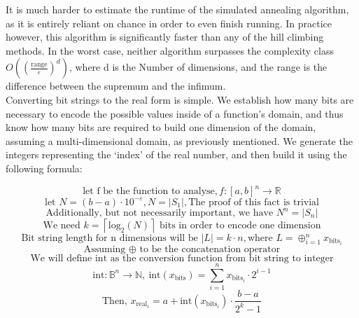 \documentclass{article}
\begin{document}
It is much harder to estimate the runtime of the simulated annealing algorithm, as it is entirely reliant on chance in order to even finish running. In practice however, this algorithm is significantly faster than any of the hill climbing methods.
In the worst case, neither algorithm surpasses the complexity class $O\left(\left(\frac{\text{range}}{\varepsilon}\right)^d\right)$, where d is the Number of dimensions, and the range is the difference between the supremum and the infimum. \\
Converting bit strings to the real form is simple. We establish how many bits are necessary to encode the possible values inside of a function's domain, and thus know how many bits are required to build one dimension of the domain, assuming a multi-dimensional domain, as previously mentioned. We generate the integers representing the `index' of the real number, and then build it using the following formula\cite{GA}:

$$ \text{let f be the function to analyse}, f \colon [a, b]^n \to \mathbb{R} $$
$$ \text{let } N = (b - a) \cdot 10^{-\varepsilon}, N = |S_1|, \text{The proof of this fact is trivial} $$
$$ \text{Additionally, but not necessarily important, we have } {N}^n = |S_n| $$
$$ \text{We need } k = \left\lceil \text{log}_2(N)\right\rceil \text{ bits in order to encode one dimension} $$
$$ \text{Bit string length for n dimensions will be } |L| = k \cdot n, \text{where } L = \oplus_{i = 1}^n x_{\text{bits}_i} $$
$$ \text{Assuming } \oplus \text{ to be the concatenation operator}$$
$$ \text{We will define int as the conversion function from bit string to integer} $$
$$ \text{int} \colon \mathbb{B}^n \to \mathbb{N}, \ 
\text{int}(x_\text{bits}) = \sum_{i = 1}^n x_{\text{bits}_i} \cdot 2^{i - 1} $$
$$ \text{Then, } x_{\text{real}_i} = a + \text{int}\left(x_{\text{bits}_i}\right) \cdot \frac{b - a}{2^k - 1} $$
\end{document}
